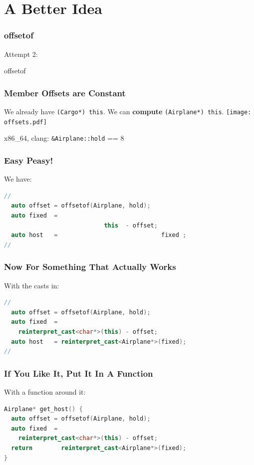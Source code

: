\documentclass{beamer}
\def\code#1{\texttt{#1}}
\newcommand{\nl}{\vspace{0.2\baselineskip}}
\begin{document}
\section{A Better Idea}

\begin{frame}[fragile]
\frametitle{offsetof}
\begin{center}
  Attempt 2:\nl\nl

  {\Huge offsetof}
\end{center}
\end{frame}


\begin{frame}[fragile]
\frametitle{Member Offsets are Constant}
\begin{center}
  We already have \code{(Cargo*) this}. We can \textbf{compute}
  \code{(Airplane*) this}.
  \texttt{[image: offsets.pdf]}

  x86\_64, clang: \code{\&Airplane::hold} == 8
\end{center}
\end{frame}


\begin{frame}[fragile]
\frametitle{Easy Peasy!}
\begin{center}
  We have:
\end{center}
\begin{lstlisting}[language=cpp]
//
  auto offset = offsetof(Airplane, hold);
  auto fixed  =
                            this  - offset;
  auto host   =                             fixed ;
// 
\end{lstlisting}
\end{frame}


\begin{frame}[fragile]
\frametitle{Now For Something That Actually Works}
\begin{center}
  With the casts in:
\end{center}
\begin{lstlisting}[language=cpp]
//
  auto offset = offsetof(Airplane, hold);
  auto fixed  =
    reinterpret_cast<char*>(this) - offset;
  auto host   = reinterpret_cast<Airplane*>(fixed);
// 
\end{lstlisting}
\end{frame}


\begin{frame}[fragile]
\frametitle{If You Like It, Put It In A Function}
\begin{center}
  With a function around it:
\end{center}
\begin{lstlisting}[language=cpp]
Airplane* get_host() {
  auto offset = offsetof(Airplane, hold);
  auto fixed  =
    reinterpret_cast<char*>(this) - offset;
  return        reinterpret_cast<Airplane*>(fixed);
}
\end{lstlisting}
\end{frame}
\end{document}
